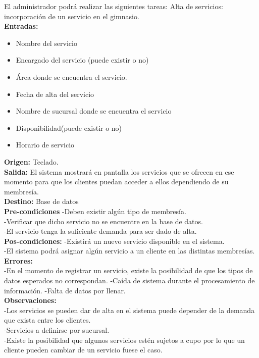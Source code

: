 El administrador podrá realizar las siguientes tareas:
Alta de servicios: incorporación de un servicio en el gimnasio.\\
\textbf{Entradas: } 
    \begin{itemize}
	 \item Nombre del servicio
         \item Encargado del servicio (puede existir o no)
         \item Área donde se encuentra el servicio.
	 \item Fecha de alta del servicio
	 \item Nombre de sucursal donde se encuentra el servicio
	 \item Disponibilidad(puede existir o no)
	 \item Horario de servicio\\
 \end{itemize}
          
\textbf{Origen: }  Teclado.\\
\textbf{Salida: }  El sistema mostrará en pantalla los servicios que se ofrecen en ese momento para que los clientes puedan acceder a ellos dependiendo de su membresía.\\
\textbf{Destino: }  Base de datos \\
\textbf{Pre-condiciones }  
-Deben existir algún tipo de membresía.\\
-Verificar que dicho servicio no se encuentre en la base de datos.\\
-El servicio tenga la suficiente demanda para ser dado de alta.\\
\textbf{Pos-condiciones: }  
-Existirá un nuevo servicio disponible en el sistema.\\
-El sistema podrá asignar algún servicio a un cliente en las distintas membresías. \\
\textbf{Errores: }  \\
-En el momento de registrar un servicio, existe la posibilidad de que los tipos   de datos esperados  no correspondan.
-Caída de sistema durante el procesamiento de información.
-Falta de datos por llenar.\\
\textbf{Observaciones: }  \\
	 

-Los servicios se pueden dar de alta en el sistema puede depender de la demanda que exista entre los clientes. \\
-Servicios a definirse por sucursal.\\
-Existe la posibilidad que algunos servicios estén sujetos a cupo por lo que un cliente pueden cambiar de un servicio fuese el caso.\\


